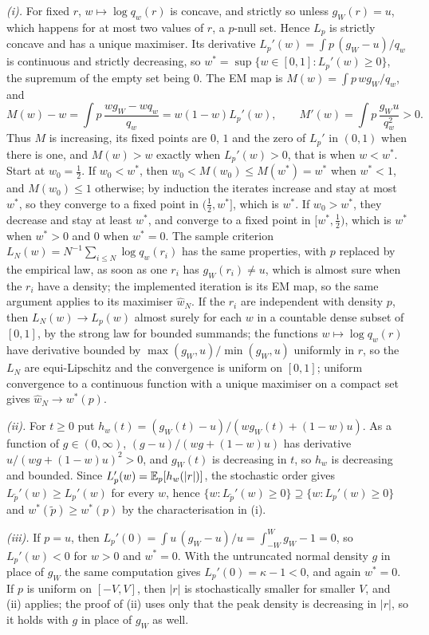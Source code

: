 \emph{(i).} For fixed $r$, $w\mapsto\log q_w(r)$ is concave, and strictly so unless
$g_W(r)=u$, which happens for at most two values of $r$, a $p$-null set. Hence $L_p$ is
strictly concave and has a unique maximiser. Its derivative
$L_p'(w)=\int p\,(g_W-u)/q_w$ is continuous and strictly decreasing, so
$w^\ast=\sup\{w\in[0,1]:L_p'(w)\ge0\}$, the supremum of the empty set being $0$. The EM map
is $M(w)=\int p\,wg_W/q_w$, and
\[
M(w)-w=\int p\,\frac{wg_W-wq_w}{q_w}=w(1-w)L_p'(w),
\qquad
M'(w)=\int p\,\frac{g_Wu}{q_w^{2}}>0 .
\]
Thus $M$ is increasing, its fixed points are $0$, $1$ and the zero of $L_p'$ in $(0,1)$
when there is one, and $M(w)>w$ exactly when $L_p'(w)>0$, that is when $w<w^\ast$. Start at
$w_0=\tfrac12$. If $w_0<w^\ast$, then $w_0<M(w_0)\le M(w^\ast)=w^\ast$ when $w^\ast<1$,
and $M(w_0)\le1$ otherwise; by induction the iterates increase and stay at most $w^\ast$, so
they converge to a fixed point in $(\tfrac12,w^\ast]$, which is $w^\ast$. If $w_0>w^\ast$,
they decrease and stay at least $w^\ast$, and converge to a fixed point in $[w^\ast,\tfrac12)$,
which is $w^\ast$ when $w^\ast>0$ and $0$ when $w^\ast=0$. The sample criterion
$L_N(w)=N^{-1}\sum_{i\le N}\log q_w(r_i)$ has the same properties, with $p$ replaced by the
empirical law, as soon as one $r_i$ has $g_W(r_i)\ne u$, which is almost sure when the
$r_i$ have a density; the implemented iteration is its EM map, so the same argument applies
to its maximiser $\hat w_N$. If the $r_i$ are independent with density $p$, then
$L_N(w)\to L_p(w)$ almost surely for each $w$ in a countable dense subset of $[0,1]$, by the
strong law for bounded summands; the functions $w\mapsto\log q_w(r)$ have derivative bounded
by $\max(g_W,u)/\min(g_W,u)$ uniformly in $r$, so the $L_N$ are equi-Lipschitz and the
convergence is uniform on $[0,1]$; uniform convergence to a continuous function with a unique
maximiser on a compact set gives $\hat w_N\to w^\ast(p)$.

\emph{(ii).} For $t\ge0$ put $h_w(t)=(g_W(t)-u)/(wg_W(t)+(1-w)u)$. As a function of
$g\in(0,\infty)$, $(g-u)/(wg+(1-w)u)$ has derivative $u/(wg+(1-w)u)^{2}>0$, and $g_W(t)$ is
decreasing in $t$, so $h_w$ is decreasing and bounded. Since
$L_p'(w)=\mathbb{E}_p[h_w(|r|)]$, the stochastic order gives $L_{\tilde p}'(w)\ge L_p'(w)$ for every
$w$, hence $\{w:L_{\tilde p}'(w)\ge0\}\supseteq\{w:L_p'(w)\ge0\}$ and
$w^\ast(\tilde p)\ge w^\ast(p)$ by the characterisation in (i).

\emph{(iii).} If $p=u$, then $L_p'(0)=\int u\,(g_W-u)/u=\int_{-W}^{W}g_W-1=0$, so
$L_p'(w)<0$ for $w>0$ and $w^\ast=0$. With the untruncated normal density $g$ in place of
$g_W$ the same computation gives $L_p'(0)=\kappa-1<0$, and again $w^\ast=0$. If $p$ is uniform
on $[-V,V]$, then $|r|$ is stochastically smaller for smaller $V$, and (ii) applies; the
proof of (ii) uses only that the peak density is decreasing in $|r|$, so it holds with $g$
in place of $g_W$ as well.

